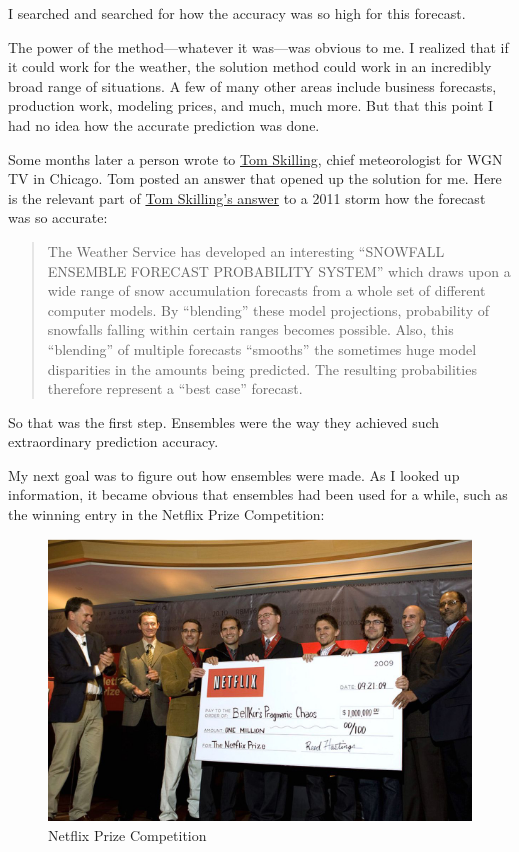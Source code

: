 \documentclass[
]{book}
\begin{document}
I searched and searched for how the accuracy was so high for this
forecast.

The power of the method---whatever it was---was obvious to me. I realized
that if it could work for the weather, the solution method could work in
an incredibly broad range of situations. A few of many other areas
include business forecasts, production work, modeling prices, and much,
much more. But that this point I had no idea how the accurate prediction
was done.

Some months later a person wrote to \href{https://en.wikipedia.org/wiki/Tom_Skilling}{Tom
Skilling}, chief
meteorologist for WGN TV in Chicago. Tom posted an answer that opened up
the solution for me. Here is the relevant part of \href{https://www.facebook.com/TomSkilling/posts/531146448370303}{Tom Skilling's
answer} to a
2011 storm how the forecast was so accurate:

\begin{quote}
The Weather Service has developed an interesting ``SNOWFALL ENSEMBLE
FORECAST PROBABILITY SYSTEM'' which draws upon a wide range of snow
accumulation forecasts from a whole set of different computer models.
By ``blending'' these model projections, probability of snowfalls
falling within certain ranges becomes possible. Also, this ``blending''
of multiple forecasts ``smooths'' the sometimes huge model disparities
in the amounts being predicted. The resulting probabilities therefore
represent a ``best case'' forecast.
\end{quote}

So that was the first step. Ensembles were the way they achieved such
extraordinary prediction accuracy.

My next goal was to figure out how ensembles were made. As I looked up
information, it became obvious that ensembles had been used for a while,
such as the winning entry in the Netflix Prize Competition:

\begin{figure}
\centering
\includegraphics{_book/images/netflix_prize.jpg}
\caption{Netflix Prize Competition}
\end{figure}
\end{document}
